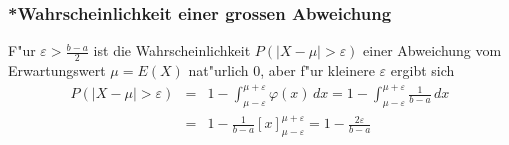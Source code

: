 \subsubsection{*Wahrscheinlichkeit einer grossen Abweichung}
{\small
F"ur $\varepsilon>\frac{b-a}2$ ist die Wahrscheinlichkeit
$P(|X-\mu|>\varepsilon)$
einer Abweichung vom Erwartungswert $\mu=E(X)$ nat"urlich $0$,
aber f"ur kleinere $\varepsilon$ ergibt sich
\begin{eqnarray*}
P(|X-\mu|>\varepsilon)
&=&1-\int_{\mu-\varepsilon}^{\mu+\varepsilon}\varphi(x)\,dx
=1-\int_{\mu-\varepsilon}^{\mu+\varepsilon}\frac{1}{b-a}\,dx\\
&=&1-\frac1{b-a}\left[x\right]_{\mu-\varepsilon}^{\mu+\varepsilon}=1-\frac{2\varepsilon}{b-a}
\end{eqnarray*}
}

